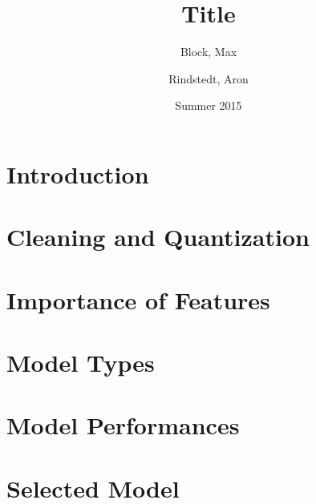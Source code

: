 \documentclass[10pt,a4paper]{article}
\title{Title}
\author{Block, Max \and Rindstedt, Aron}
\date{Summer 2015}
\begin{document}
\maketitle
\thispagestyle{empty}
\tableofcontents
\eject
\section{Introduction}


\section{Cleaning and Quantization}


\section{Importance of Features}


\section{Model Types}


\section{Model Performances}


\section{Selected Model}

\end{document}
